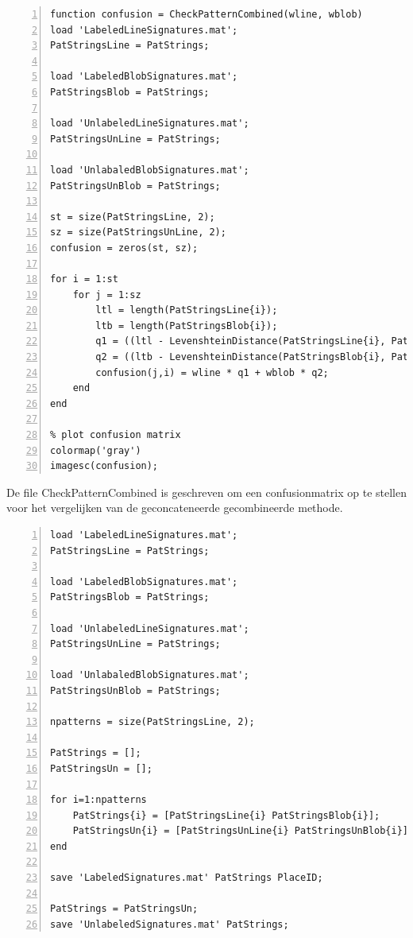 \documentclass[a4paper]{article}
\begin{document}
\begin{lstlisting}[caption= CheckPatternCombined.m, label=lst:checkcombined, numbers=left]
function confusion = CheckPatternCombined(wline, wblob)
load 'LabeledLineSignatures.mat';
PatStringsLine = PatStrings;

load 'LabeledBlobSignatures.mat';
PatStringsBlob = PatStrings;

load 'UnlabeledLineSignatures.mat';
PatStringsUnLine = PatStrings;

load 'UnlabaledBlobSignatures.mat';
PatStringsUnBlob = PatStrings;

st = size(PatStringsLine, 2);   
sz = size(PatStringsUnLine, 2);
confusion = zeros(st, sz);

for i = 1:st
	for j = 1:sz
        ltl = length(PatStringsLine{i});
        ltb = length(PatStringsBlob{i});
        q1 = ((ltl - LevenshteinDistance(PatStringsLine{i}, PatStringsUnLine{j})) / ltl) * 100;
        q2 = ((ltb - LevenshteinDistance(PatStringsBlob{i}, PatStringsUnBlob{j})) / ltb) * 100;
        confusion(j,i) = wline * q1 + wblob * q2;
	end
end

% plot confusion matrix
colormap('gray')
imagesc(confusion);
\end{lstlisting}
De file CheckPatternCombined is geschreven om een confusionmatrix op te stellen voor het vergelijken van de geconcateneerde gecombineerde methode.

\begin{lstlisting}[caption= CombineSignatures.m, label=lst:checkconcat, numbers=left]
load 'LabeledLineSignatures.mat';
PatStringsLine = PatStrings;

load 'LabeledBlobSignatures.mat';
PatStringsBlob = PatStrings;

load 'UnlabeledLineSignatures.mat';
PatStringsUnLine = PatStrings;

load 'UnlabaledBlobSignatures.mat';
PatStringsUnBlob = PatStrings;

npatterns = size(PatStringsLine, 2);

PatStrings = [];
PatStringsUn = [];

for i=1:npatterns
    PatStrings{i} = [PatStringsLine{i} PatStringsBlob{i}];
    PatStringsUn{i} = [PatStringsUnLine{i} PatStringsUnBlob{i}];
end

save 'LabeledSignatures.mat' PatStrings PlaceID;

PatStrings = PatStringsUn;
save 'UnlabeledSignatures.mat' PatStrings;

\end{lstlisting}
\end{document}
